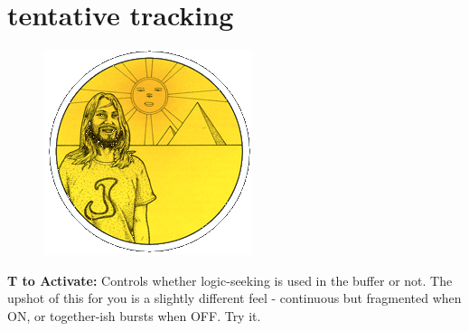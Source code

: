 \clearpage

\section*{tentative tracking} 
\label{sec:tracking}
\lstset{style=6502Style}
\lstset{ 
   aboveskip=5pt,
   belowskip=0pt,
}

\begin{definition}
\setlength{\intextsep}{0pt}%
\setlength{\columnsep}{3pt}%
\begin{figure}
\includegraphics[width=\linewidth]{src/callout/psych.png} 
\end{figure}
\small
\textbf{T to Activate:} Controls whether logic-seeking is used in
the buffer or not. The upshot of this for you is a slightly different
feel - continuous but fragmented when ON, or together-ish bursts
when OFF. Try it.
\\
\end{definition}

